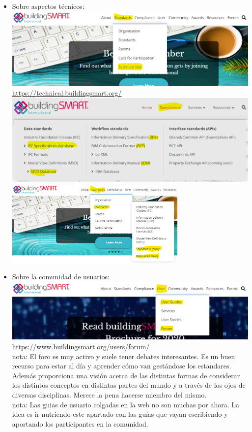 \documentclass[spanish,10pt,a4paper,final,oneside]{article}
\begin{document}
\begin{itemize}
\item Sobre aspectos técnicos:
\\ \includegraphics[width=\textwidth]{web - Standards - Technical Site}
\\ \url{https://technical.buildingsmart.org/}
\\ \includegraphics[width=\textwidth]{web - technical - Standards}
\\ \includegraphics[width=0.7\textwidth]{web - Standards - Standards - libraries}

\item Sobre la comunidad de usuarios:
\\ \includegraphics[width=\textwidth]{web - User}
\\ \url{https://www.buildingsmart.org/users/forum/}
\\nota: El foro es muy activo y suele tener debates interesantes. Es un buen recurso para estar al día y aprender  cómo van gestándose los estandares. Además proporciona una visión acerca de las distintas formas de considerar los distintos conceptos en distintas partes del mundo y a través de los ojos de diversas disciplinas. Merece la pena hacerse miembro del mismo.
\\nota: Las guias de usuario colgadas en la web no son muchas por ahora. La idea es ir nutriendo este apartado con las guías que vayan escribiendo y aportando los participantes en la comunidad.


\end{itemize}
\end{document}
